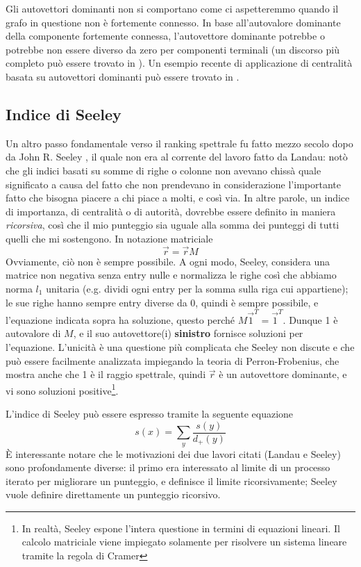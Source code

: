 Gli autovettori dominanti non si comportano come ci aspetteremmo quando il grafo in questione non è fortemente connesso. In base all'autovalore dominante della componente fortemente connessa, l'autovettore dominante potrebbe o potrebbe non essere diverso da zero per componenti terminali (un discorso più completo può essere trovato in \cite{autovalori}).
Un esempio recente di applicazione di centralità basata su autovettori dominanti può essere trovato in \cite{calcio}.
\subsection{Indice di Seeley}
Un altro passo fondamentale verso il ranking spettrale fu fatto mezzo secolo dopo da John R. Seeley \cite{seeley}
, il quale non era al corrente del lavoro fatto da Landau: notò che gli indici basati su somme di righe o colonne non avevano chissà quale significato a causa del fatto che non prendevano in considerazione l'importante fatto che bisogna piacere a chi piace a molti, e così via. In altre parole, un indice di importanza, di centralità o di autorità, dovrebbe essere definito in maniera \textit{ricorsiva}, così che il mio punteggio sia uguale alla somma dei punteggi di tutti quelli che mi sostengono. In notazione matriciale
\begin{equation*}
    \vec{r} = \vec{r}M
\end{equation*}
Ovviamente, ciò non è sempre possibile. A ogni modo, Seeley, considera una matrice non negativa senza entry nulle e normalizza le righe così che abbiamo norma $l_1$ unitaria (e.g. dividi ogni entry per la somma sulla riga cui appartiene); le sue righe hanno sempre entry diverse da 0, quindi è sempre possibile, e l'equazione indicata sopra ha soluzione, questo perché $M\vec{1}^T = \vec{1}^T$. Dunque 1 è autovalore di $M$, e il suo autovettore(i) \textbf{sinistro} fornisce soluzioni per l'equazione. L'unicità è una questione più complicata che Seeley non discute e che può essere facilmente analizzata impiegando la teoria di Perron-Frobenius, che mostra anche che 1 è il raggio spettrale, quindi $\vec{r}$ è  un autovettore dominante, e vi sono soluzioni positive\footnote{In realtà, Seeley espone l'intera questione in termini di equazioni lineari. Il calcolo matriciale viene impiegato solamente per risolvere un sistema lineare tramite la regola di Cramer}.

L'indice di Seeley può essere espresso tramite la seguente equazione
\begin{equation}
    s(x) = \sum_y{\frac{s(y)}{d_+(y)}}
\end{equation}
È interessante notare che le motivazioni dei due lavori citati (Landau e Seeley) sono profondamente diverse: il primo era interessato al limite di un processo iterato per migliorare un punteggio, e definisce il limite ricorsivamente; Seeley vuole definire direttamente un punteggio ricorsivo.

